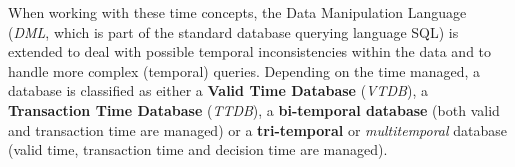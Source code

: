 
When working with these time concepts, the Data Manipulation Language (\emph{DML}, which is part of the standard database querying language SQL) is extended to deal with possible temporal inconsistencies within the data and to handle more complex (temporal) queries. 
Depending on the time managed, a database is classified as either a \textbf{Valid Time Database} (\emph{VTDB}), a \textbf{Transaction Time Database} (\emph{TTDB}), a \textbf{bi-temporal database} (both valid and transaction time are managed) or a \textbf{tri-temporal} or \emph{multitemporal} database (valid time, transaction time and decision time are managed).

	
